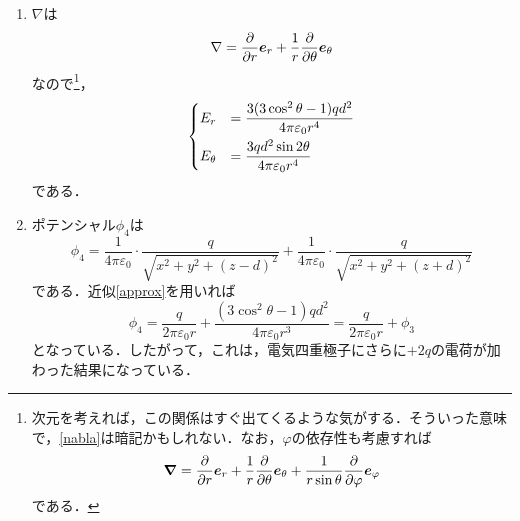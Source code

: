 \documentclass[a4paper,pdflatex,ja=standard]{bxjsarticle}
\begin{document}
\begin{enumerate}
  \item 
  $\nabla$は
  \begin{equation}
    \nabla
    =
    \pdv{}{r}\bm{e}_{r}
    +
    \frac{1}{r}\pdv{}{\theta}\bm{e}_{\theta}
    \label{nabla}
  \end{equation}
  なので\footnote{次元を考えれば，この関係はすぐ出てくるような気がする．そういった意味で，\eqref{nabla}は暗記かもしれない．なお，$\varphi$の依存性も考慮すれば$$\grad
  =
  \pdv{}{r}\bm{e}_{r}
  +
  \frac{1}{r}\pdv{}{\theta}\bm{e}_{\theta}
  +
  \frac{1}{r\sin\theta}\pdv{}{\varphi}\bm{e}_{\varphi}\nonumber$$である．}，
  \begin{equation}
    \begin{dcases}
      E_{r}
      &=
      \frac{3(3\cos^2\theta-1)qd^2}{4\pi\varepsilon_{0}r^4}
      \\
      E_{\theta}
      &=
      \frac{3qd^2\sin 2\theta}{4\pi\varepsilon_{0}r^4}
    \end{dcases}
  \end{equation}
  である．

  \item 
  ポテンシャル$\phi_{4}$は
  \begin{equation}
    \phi_{4}
    =
    \frac{1}{4\pi\varepsilon_{0}}\cdot\frac{q}{\sqrt{x^2+y^2+(z-d)^2}}
    +
    \frac{1}{4\pi\varepsilon_{0}}\cdot\frac{q}{\sqrt{x^2+y^2+(z+d)^2}}
  \end{equation}
  である．近似\eqref{approx}を用いれば
  \begin{equation}
    \phi_{4}
    =
    \frac{q}{2\pi\varepsilon_{0}r}
    +
    \frac{(3\cos^2\theta-1)qd^2}{4\pi\varepsilon_{0}r^3}
    =
    \frac{q}{2\pi\varepsilon_{0}r}
    +
    \phi_{3}
  \end{equation}
  となっている．したがって，これは，電気四重極子にさらに$+2q$の電荷が加わった結果になっている．
\end{enumerate}
\end{document}
